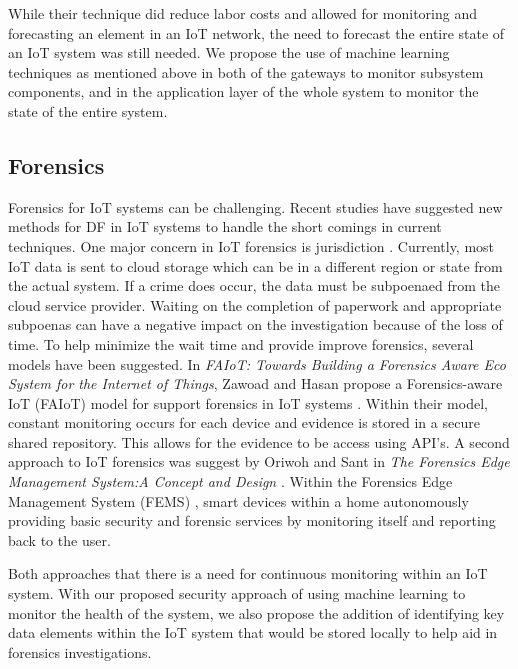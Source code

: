 \documentclass[../main.tex]{subfiles}
\begin{document}
While their technique did reduce labor costs and allowed for monitoring and forecasting an element in an IoT network, the need to forecast the entire state of an IoT system was still needed. We propose the use of machine learning techniques as mentioned above in both of the gateways to monitor subsystem components, and in the application layer of the whole system to monitor the state of the entire system.


\subsection{Forensics}
Forensics for IoT systems can be challenging. Recent studies have suggested new methods for DF in IoT systems to handle the short comings in current techniques. One major concern in IoT forensics is jurisdiction \cite{DBLP:conf/colcom/OriwohJES13}. Currently, most IoT data is sent to cloud storage which can be in a different region or state from the actual system. If a crime does occur, the data must be subpoenaed from the cloud service provider. Waiting on the completion of paperwork and appropriate subpoenas can have a negative impact on the investigation because of the loss of time. To help minimize the wait time and provide improve forensics, several models have been suggested. In \textit{FAIoT: Towards Building a Forensics Aware Eco System for the Internet of Things}, Zawoad and Hasan propose a Forensics-aware IoT (FAIoT)  model for support forensics in IoT systems \cite{DBLP:conf/IEEEscc/ZawoadH15}. Within their model, constant monitoring occurs for each device and evidence is stored in a secure shared repository. This allows for the evidence to be access using API's. A second approach to IoT forensics was suggest by Oriwoh and Sant in \textit{The Forensics Edge Management System:A Concept and Design} \cite{DBLP:conf/uic/OriwohS13}. Within the Forensics Edge Management System (FEMS) , smart devices within a home autonomously providing basic security and
forensic services by monitoring itself and reporting back to the user. 

Both approaches that there is a need for continuous monitoring within an IoT system. With our proposed security approach of using machine learning to monitor the health of the system, we also propose the addition of identifying key data elements within the IoT system that would be stored locally to help aid in forensics investigations. 
\end{document}
